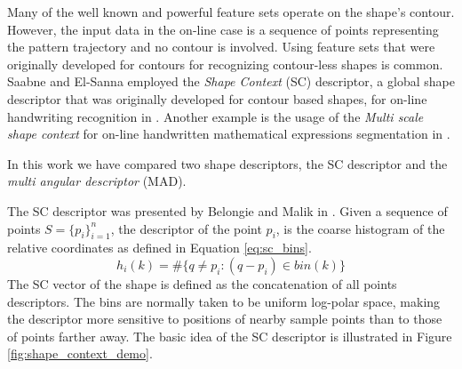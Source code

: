 \iftoggle{edit-mode}{\hspace{0pt}\marginpar{Using off-line shape descriptors for on-line HWR}}{}
Many of the well known and powerful feature sets operate on the shape's contour.  
However, the input data in the on-line case is a sequence of points representing the pattern trajectory and no contour is involved. 
Using feature sets that were originally developed for contours for recognizing contour-less shapes is common. 
Saabne and El-Sanna employed the \emph{Shape Context} (SC) descriptor, a global shape descriptor that was originally developed for contour based shapes, for on-line handwriting recognition in \cite{saabni2009hierarchical}. 
Another example is the usage of the \emph{Multi scale shape context} for on-line handwritten mathematical expressions segmentation in \cite{husegmenting}. 

\iftoggle{edit-mode}{\hspace{0pt}\marginpar{Selected Descriptors}}{}
In this work we have compared two shape descriptors, the SC descriptor and the \emph{multi angular descriptor} (MAD). 

\iftoggle{edit-mode}{\hspace{0pt}\marginpar{Shape Context}}{}
The SC descriptor was presented by Belongie and Malik in \cite{belongie2002shape}.
Given a sequence of points $S=\{p_i\}_{i=1}^n$, the descriptor of the point ${p_i}$, is the coarse histogram of the relative coordinates as defined in Equation \ref{eq:sc_bins}.
\begin{equation}
{h_i}(k) = \# \{q \ne p_i:(q - p_i) \in bin(k) \}
\label{eq:sc_bins}
\end{equation}
The SC vector of the shape is defined as the concatenation of all points descriptors.
The bins are normally taken to be uniform log-polar space, making the descriptor more sensitive to positions of nearby sample points than to those of points farther away. 
The basic idea of the SC descriptor is illustrated in Figure \ref{fig:shape_context_demo}. 


